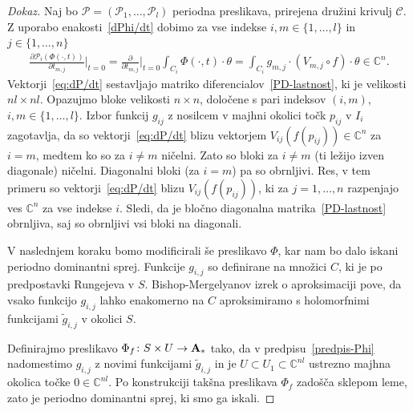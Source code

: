 \documentclass[12pt,a4paper,twoside]{article}
\theoremstyle{definition} %
\newenvironment{dokaz}[1][Dokaz]{\begin{proof}[#1]}{\end{proof}}
\theoremstyle{plain} %
\numberwithin{equation}{section}  %
\newcommand{\C}{\mathbb C}
\begin{document}
\begin{dokaz}
Naj bo $\mathcal{P} = (\mathcal{P}_{1}, \dots, \mathcal{P}_{l})$ periodna preslikava, prirejena družini krivulj $\mathcal{C}$. Z uporabo enakosti~\eqref{dPhi/dt} dobimo za vse indekse $i, m \in \{1, \dots, l \}$ in $j \in \{1, \dots, n \}$
\begin{gather} \label{eq:dP/dt}
\frac{\partial \mathcal{P}_{i}(\Phi(\cdot, t))}{\partial t_{m,j}} \Big|_{t=0} = \frac{\partial}{\partial t_{m,j}} \Big|_{t=0} \int_{C_{i}} \Phi(\cdot, t) \cdot \theta = \int_{C_{i}} g_{m,j} \cdot (V_{m,j} \circ f) \cdot \theta \in \C^{n}.
\end{gather}
Vektorji~\eqref{eq:dP/dt} sestavljajo matriko diferencialov~\eqref{PD-lastnost}, ki je velikosti $nl \times nl$. Opazujmo bloke velikosti $n \times n$, določene s pari indeksov $(i,m)$, $i,m \in \{1, \dots, l\}$. Izbor funkcij $g_{ij}$ z nosilcem v majhni okolici točk $p_{ij}$ v $I_{i}$ zagotavlja, da so vektorji~\eqref{eq:dP/dt} blizu vektorjem $V_{ij}(f(p_{ij})) \in \C^{n}$ za $i=m$, medtem ko so za $i \neq m$ ničelni. Zato so bloki za $i \neq m$ (ti ležijo izven diagonale) ničelni. Diagonalni bloki (za $i=m$) pa so obrnljivi. Res, v tem primeru so vektorji~\eqref{eq:dP/dt} blizu $V_{ij}(f(p_{ij}))$, ki za $j=1, \dots, n$ razpenjajo ves $\C^{n}$ za vse indekse $i$.
Sledi, da je bločno diagonalna matrika~\eqref{PD-lastnost} obrnljiva, saj so obrnljivi vsi bloki na diagonali.

V naslednjem koraku bomo modificirali še preslikavo $\Phi$, kar nam bo dalo iskani periodno dominantni sprej.
Funkcije $g_{i,j}$ so definirane na množici $C$, ki je po predpostavki Rungejeva v $S$. Bishop-Mergelyanov izrek o aproksimaciji pove, da vsako funkcijo $g_{i,j}$ lahko enakomerno na $C$ aproksimiramo s holomorfnimi funkcijami $\tilde{g}_{i,j}$ v okolici $S$.

Definirajmo preslikavo $\Phi_{f} \colon S \times U \to \textbf{\textup{A}}_{*}$ tako, da v predpisu~\eqref{predpis-Phi} nadomestimo $g_{i,j}$ z novimi funkcijami $\tilde{g}_{i,j}$ in je $U \subset U_{1} \subset \C^{nl}$ ustrezno majhna okolica točke $0 \in \mathbb{C}^{nl}$. Po konstrukciji takšna preslikava $\Phi_{f}$ zadošča sklepom leme, zato je periodno dominantni sprej, ki smo ga iskali.


\end{dokaz}
\end{document}
